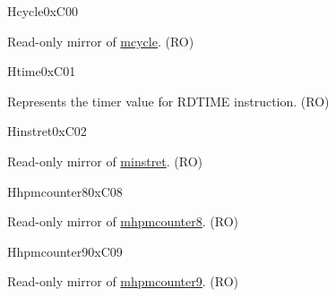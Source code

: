 \begin{register}{H}{cycle}{0xC00}\label{regdesc:CYCLE}
%
\regnewline%
\begin{regdesc}\begin{reglist}
\label{fielddesc:CYCLE}\item [CYCLE] Read-only mirror of \hyperref[regdesc:MCYCLE]{mcycle}. (RO)
\end{reglist}\end{regdesc}
\end{register}

\begin{register}{H}{time}{0xC01}\label{regdesc:TIME}
%
\regnewline%
\begin{regdesc}\begin{reglist}
\label{fielddesc:TIME}\item [TIME] Represents the timer value for RDTIME instruction. (RO)
\end{reglist}\end{regdesc}
\end{register}

\begin{register}{H}{instret}{0xC02}\label{regdesc:INSTRET}
%
\regnewline%
\begin{regdesc}\begin{reglist}
\label{fielddesc:INSTRET}\item [INSTRET] Read-only mirror of \hyperref[regdesc:MINSTRET]{minstret}. (RO)
\end{reglist}\end{regdesc}
\end{register}

\begin{register}{H}{hpmcounter8}{0xC08}\label{regdesc:HPMCOUNTER8}
%
\regnewline%
\begin{regdesc}\begin{reglist}
\label{fielddesc:HPMCOUNTER8}\item [HPMCOUNTER8] Read-only mirror of \hyperref[regdesc:MHPMCOUNTER8]{mhpmcounter8}. (RO)
\end{reglist}\end{regdesc}
\end{register}


\begin{register}{H}{hpmcounter9}{0xC09}\label{regdesc:HPMCOUNTER9}
%
\regnewline%
\begin{regdesc}\begin{reglist}
\label{fielddesc:HPMCOUNTER9}\item [HPMCOUNTER9] Read-only mirror of \hyperref[regdesc:MHPMCOUNTER9]{mhpmcounter9}. (RO)
\end{reglist}\end{regdesc}
\end{register}

